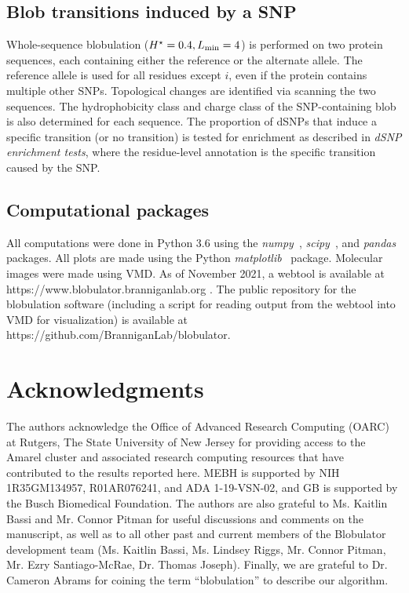 \documentclass[9pt,twocolumn,twoside,lineno]{pnas-new}
\newcommand{\inserted}[1]{{#1}}
\newcommand{\hydrochar}{hydrophobicity class}
\newcommand{\chargechar}{charge class}
\newcommand{\Ht}{H^{\star}}
\newcommand{\Lmin}{L_{\rm min}}
\begin{document}
\subsection*{Blob transitions induced by a SNP}
Whole-sequence blobulation ($\Ht=0.4,\Lmin=4$) is performed on two protein sequences, each containing either the reference or the alternate allele. The reference allele is used for all residues except $i$, even if the protein contains multiple other SNPs. Topological changes are identified via scanning the two sequences. The \hydrochar{} and \chargechar{} of the SNP-containing blob is also determined for each sequence. The proportion of dSNPs that induce a specific transition (or no transition) is tested for enrichment as described in {\em dSNP enrichment tests}, where the residue-level annotation is the specific transition caused by the SNP. 

\subsection*{Computational packages}
All computations were done in Python 3.6 using the \textit{numpy}~\cite{harris2020array}, \textit{scipy}~\cite{scipy2020}, and \textit{pandas}~\cite{pandas2020} packages. All plots are made using the Python \textit{matplotlib}~\cite{Hunter:2007} package. \inserted{Molecular images were made using VMD\cite{Humphrey1996}. As of November 2021, a webtool is available at {https://www.blobulator.branniganlab.org} .  The public repository for the blobulation software (including a script for reading output from the webtool into VMD for visualization) is available at {https://github.com/BranniganLab/blobulator}.}

\section*{Acknowledgments}

The authors acknowledge the Office of Advanced Research Computing (OARC) at Rutgers, The State University of New Jersey for providing access to the Amarel cluster and associated research computing resources that have contributed to the results reported here. MEBH is supported by NIH 1R35GM134957, R01AR076241, and ADA 1-19-VSN-02, and GB is supported by the Busch Biomedical Foundation. The authors are also grateful to Ms. Kaitlin Bassi and Mr. Connor Pitman for useful discussions and comments on the manuscript, \inserted{as well as to all other past and current members of the Blobulator development team (Ms. Kaitlin Bassi, Ms. Lindsey Riggs, Mr. Connor Pitman, Mr. Ezry Santiago-McRae, Dr. Thomas Joseph).} Finally, we are grateful to Dr. Cameron Abrams for coining the term ``blobulation'' to describe our algorithm. 
\end{document}
